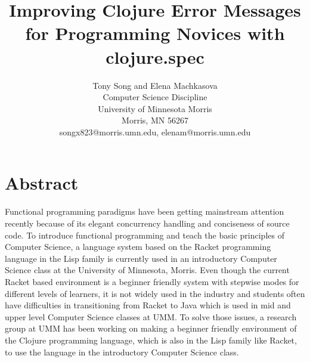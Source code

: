 \documentclass[12pt]{article}
\newcommand{\comment}[1]{{\bf \tt  {#1}}}
\begin{document}
\pagestyle{plain}
%

\title{Improving Clojure Error Messages for Programming Novices with clojure.spec}
%
%

\author{
Tony Song and Elena Machkasova \\
Computer Science Discipline \\
University of Minnesota Morris\\
Morris, MN 56267\\
songx823@morris.umn.edu, elenam@morris.umn.edu
}
\date{}
\maketitle
\thispagestyle{empty}

\section*{\centering Abstract}
Functional programming paradigms have been getting mainstream attention recently because of its elegant concurrency 
handling and conciseness of source code. To introduce functional programming and teach the basic principles of Computer 
Science, a language system based on the Racket programming language in the Lisp family is currently used in an introductory 
Computer Science class at the University of Minnesota, Morris. Even though the current Racket based environment is a 
beginner friendly system with stepwise modes for different levels of learners, it is not widely used in the industry and 
students often have difficulties in transitioning from Racket to Java which is used in mid and upper level Computer Science 
classes at UMM. To solve those issues, a research group at UMM has been working on making a beginner friendly environment 
of the Clojure programming language, which is also in the Lisp family like Racket, to use the language in the introductory 
Computer Science class.
\end{document}
